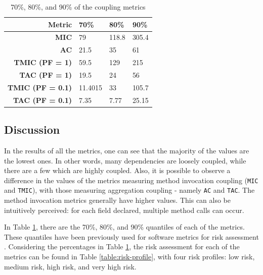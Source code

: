 \begin{table}[ht!]
    \begin{center}
    \begin{tabular}{|r|l|l|l|}
    \hline
    \textbf{Metric} & \textbf{70\%} & \textbf{80\%} & \textbf{90\%} \\ \hline\hline
    \textbf{MIC} & 79 & 118.8 & 305.4 \\ \hline
    \textbf{AC} & 21.5 & 35 & 61 \\ \hline
    \textbf{TMIC (PF = 1)} & 59.5 & 129 & 215 \\ \hline
    \textbf{TAC (PF = 1)} & 19.5 & 24 & 56 \\ \hline
    \textbf{TMIC (PF = 0.1)} & 11.4015 & 33 & 105.7 \\ \hline
    \textbf{TAC (PF = 0.1)} & 7.35 & 7.77 & 25.15 \\ \hline
    \end{tabular}
    \end{center}
    \caption{70\%, 80\%, and 90\% of the coupling metrics}
    \label{table:quantiles}
\end{table}


\subsection{Discussion}

In the results of all the metrics, one can see that the majority of the values are the lowest ones. In other words, many dependencies are loosely coupled, while there are a few which are highly coupled. Also, it is possible to observe a difference in the values of the metrics measuring method invocation coupling (\texttt{MIC} and \texttt{TMIC}), with those measuring aggregation coupling - namely \texttt{AC} and \texttt{TAC}. The method invocation metrics generally have higher values. This can also be intuitively perceived: for each field declared, multiple method calls can occur.

In Table \ref{table:quantiles}, there are the 70\%, 80\%, and 90\% quantiles of each of the metrics. These quantiles have been previously used for software metrics for risk assessment \cite{alves2010deriving}. Considering the percentages in Table \ref{table:quantiles}, the risk assessment for each of the metrics can be found in Table \ref{table:risk-profile}, with four risk profiles: low risk, medium risk, high risk, and very high risk.

